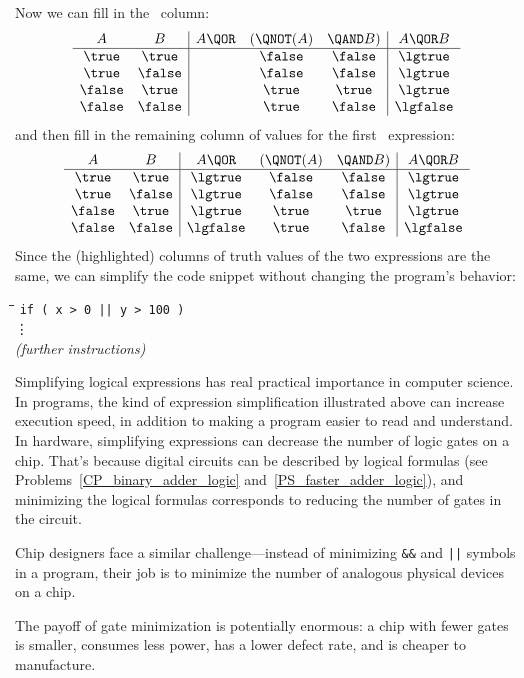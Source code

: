Now we can fill in the \QAND\ column:
\[
\begin{array}{cc|ccc|c}
A      & B      & A \QOR  &(\QNOT   (A) & \QAND  B) & A \QOR  B \\ \hline
\true  & \true  &          & \false &     \false   & \lgtrue \\
\true  & \false &          & \false &     \false   & \lgtrue \\
\false & \true  &          & \true  &     \true    & \lgtrue \\
\false & \false &          & \true  &     \false   & \lgfalse\\
\end{array}
\]
and then fill in the remaining column of values for the first \QOR\
expression:
\[
\begin{array}{cc|ccc|c}
A      & B      & A \QOR  &(\QNOT   (A) & \QAND  B) & A \QOR  B \\ \hline
\true  & \true  & \lgtrue  & \false &     \false   & \lgtrue \\
\true  & \false & \lgtrue  & \false &     \false   & \lgtrue \\
\false & \true  & \lgtrue  & \true  &     \true    & \lgtrue \\
\false & \false & \lgfalse & \true  &     \false   & \lgfalse\\
\end{array}
\]
Since the (highlighted) columns of truth values of the two expressions are
the same, we can simplify the code snippet without changing the program's
behavior:
%
\begin{tabbing}
\hspace{1in} \= \quad\quad \= \quad\quad \= \quad\quad \= \kill
\> \texttt{if ( x > 0 || y > 100 )} \\
\> \> \vdots\\
\> \emph{(further instructions)}
\end{tabbing}

 Simplifying logical expressions has real practical
importance in computer science.  In programs, the kind of expression
simplification illustrated above can increase execution speed, in addition
to making a program easier to read and understand.  In hardware,
simplifying expressions can decrease the number of logic gates on a chip.
That's because digital circuits can be described by logical formulas (see
Problems~\ref{CP_binary_adder_logic} and~\ref{PS_faster_adder_logic}), and
minimizing the logical formulas corresponds to reducing the number of
gates in the circuit.
\begin{editingnotes}
   Chip designers face a similar challenge---instead of
  minimizing \texttt{\&\&} and \texttt{||} symbols in a program, their job
  is to minimize the number of analogous physical devices on a chip.
\end{editingnotes}
The payoff of gate minimization is potentially enormous: a chip with
fewer gates is smaller, consumes less power, has a lower defect rate,
and is cheaper to manufacture.

